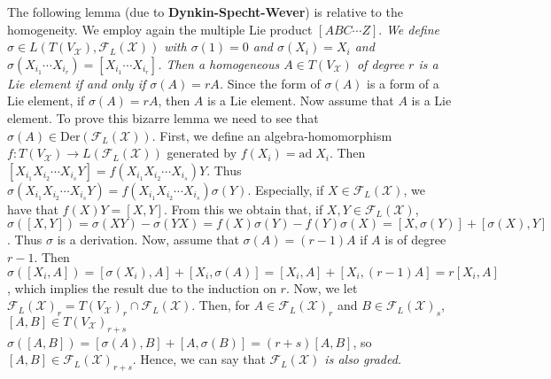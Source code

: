\documentclass{article}
\newcommand{\ad}[1]{\mathrm{ad}\; #1}
\begin{document}
The following lemma (due to \textbf{Dynkin-Specht-Wever}) is relative to the homogeneity.
We employ again the multiple Lie product $[ABC \cdots Z]$.
\textit{We define $\sigma \in L(T(V_\mathcal{X}), \mathcal{F}_L(\mathcal{X}))$ with $\sigma(1) = 0$ and $\sigma(X_i) = X_i$ and $\sigma(X_{i_1} \cdots X_{i_r}) = [X_{i_1} \cdots X_{i_r}]$.
Then a homogeneous $A \in T(V_\mathcal{X})$ of degree $r$ is a Lie element if and only if $\sigma(A) = rA$.}
Since the form of $\sigma(A)$ is a form of a Lie element, if $\sigma(A) = rA$, then $A$ is a Lie element.
Now assume that $A$ is a Lie element.
To prove this bizarre lemma we need to see that $\sigma(A) \in \textrm{Der}(\mathcal{F}_L(\mathcal{X}))$.
First, we define an algebra-homomorphism $f : T(V_\mathcal{X}) \to L(\mathcal{F}_L(\mathcal{X}))$ generated by $f(X_i) = \ad{X_i}$.
Then $[X_{i_1} X_{i_2} \cdots X_{i_s} Y] = f(X_{i_1} X_{i_2} \cdots X_{i_s}) Y$.
Thus $\sigma(X_{i_1} X_{i_2} \cdots X_{i_s} Y) = f(X_{i_1} X_{i_2} \cdots X_{i_s}) \sigma(Y)$.
Especially, if $X \in \mathcal{F}_L(\mathcal{X})$, we have that $f(X)Y = [X, Y]$.
From this we obtain that, if $X, Y \in \mathcal{F}_L(\mathcal{X})$,  $\sigma([X, Y]) = \sigma(XY) - \sigma(YX) = f(X) \sigma(Y) - f(Y) \sigma(X) = [X, \sigma(Y)] + [\sigma(X), Y]$.
Thus $\sigma$ is a derivation.
Now, assume that $\sigma(A) = (r - 1)A$ if $A$ is of degree $r - 1$.
Then $\sigma([X_i, A]) = [\sigma(X_i), A] + [X_i, \sigma(A)] = [X_i, A] + [X_i, (r - 1)A] = r[X_i, A]$, which implies the result due to the induction on $r$.
Now, we let $\mathcal{F}_L(\mathcal{X})_r = T(V_\mathcal{X})_r \cap \mathcal{F}_L(\mathcal{X})$.
Then, for $A \in \mathcal{F}_L(\mathcal{X})_r$ and $B \in \mathcal{F}_L(\mathcal{X})_s$, $[A, B] \in T(V_\mathcal{X})_{r + s}$ $\sigma([A, B]) = [\sigma(A), B] + [A, \sigma(B)] = (r + s)[A, B]$, so $[A, B] \in \mathcal{F}_L(\mathcal{X})_{r + s}$.
Hence, we can say that \textit{$\mathcal{F}_L(\mathcal{X})$ is also graded.}
\end{document}

